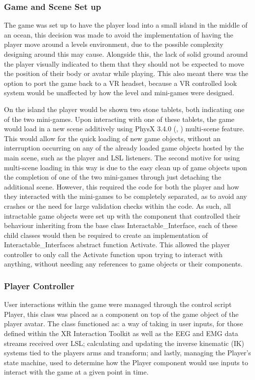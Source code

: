 \documentclass[11pt, a4paper]{article}
\newcommand{\ccite}[1]{(\citeauthor{#1}, \citeyear{#1})}
\begin{document}
\subsubsection{Game and Scene Set up}
	
The game was set up to have the player load into a small island in the middle of an ocean, this decision was made to avoid the implementation of having the player move around a levels environment, due to the possible complexity designing around this may cause. Alongside this, the lack of solid ground around the player visually indicated to them that they should not be expected to move the position of their body or avatar while playing. This also meant there was the option to port the game back to a VR headset, because a VR controlled look system would be unaffected by how the level and mini-games were designed.  
	
\hfill

On the island the player would be shown two stone tablets, both indicating one of the two mini-games. Upon interacting with one of these tablets, the game would load in a new scene additively using PhysX 3.4.0 \ccite{physx} multi-scene feature. This would allow for the quick loading of new game objects, without an interruption occurring on any of the already loaded game objects hosted by the main scene, such as the player and LSL listeners. The second motive for using multi-scene loading in this way is due to the easy clean up of game objects upon the completion of one of the two mini-games through just detaching the additional scene. However, this required the code for both the player and how they interacted with the mini-games to be completely separated, as to avoid any crashes or the need for large validation checks within the code. As such, all intractable game objects were set up with the component that controlled their behaviour inheriting from the base class Interactable\_Interface, each of these child classes would then be required to create an implementation of Interactable\_Interfaces abstract function Activate. This allowed the player controller to only call the Activate function upon trying to interact with anything, without needing any references to game objects or their components.  

	
	
\subsubsection{Player Controller}

User interactions within the game were managed through the control script Player, this class was placed as a component on top of the game object of the player avatar. The class functioned as: a way of taking in user inputs, for those defined within the XR Interaction Toolkit as well as the EEG and EMG data streams received over LSL; calculating and updating the inverse kinematic (IK) systems tied to the players arms and transform; and lastly, managing the Player's state machine, used to determine how the Player component would use inputs to interact with the game at a given point in time.
\end{document}
